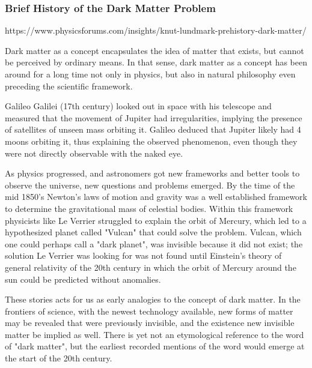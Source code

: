 \subsubsection{Brief History of the Dark Matter Problem}
\label{sec:history}

https://www.physicsforums.com/insights/knut-lundmark-prehistory-dark-matter/

Dark matter as a concept encapsulates the idea of matter that exists, but cannot be perceived by ordinary means. In that sense, dark matter as a concept has been around for a long time not only in physics, but also in natural philosophy even preceding the scientific framework. \cite{bertone2016-history-dark-matter}

Galileo Galilei (17th century) looked out in space with his telescope and measured that the movement of Jupiter had irregularities, implying the presence of satellites of unseen mass orbiting it. Galileo deduced that Jupiter likely had 4 moons orbiting it, thus explaining the observed phenomenon, even though they were not directly observable with the naked eye. \cite{bertone2016-history-dark-matter}

As physics progressed, and astronomers got new frameworks and better tools to observe the universe, new questions and problems emerged. By the time of the mid 1850’s Newton’s laws of motion and gravity was a well established framework to determine the gravitational mass of celestial bodies. Within this framework physicists like Le Verrier struggled to explain the orbit of Mercury, which led to a hypothesized planet called "Vulcan" that could solve the problem. Vulcan, which one could perhaps call a "dark planet", was invisible because it did not exist; the solution Le Verrier was looking for was not found until Einstein's theory of general relativity of the 20th century in which the orbit of Mercury around the sun could be predicted without anomalies. \cite{bertone2016-history-dark-matter}

These stories acts for us as early analogies to the concept of dark matter. In the frontiers of science, with the newest technology available, new forms of matter may be revealed that were previously invisible, and the existence new invisible matter be implied as well. There is yet not an etymological reference to the word of "dark matter", but the earliest recorded mentions of the word would emerge at the start of the 20th century. \cite{bertone2016-history-dark-matter}

